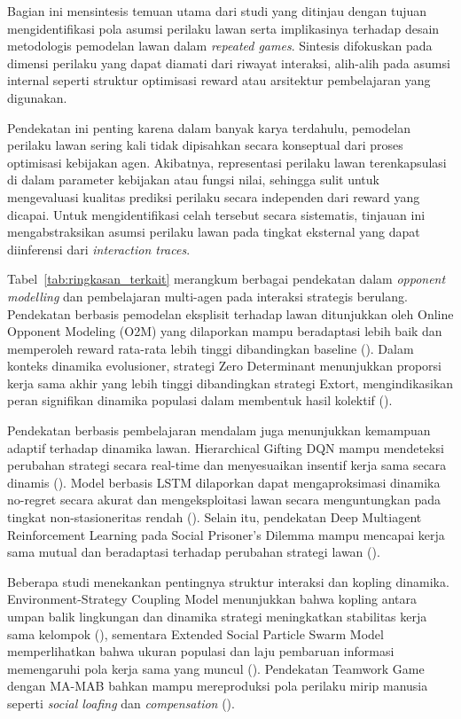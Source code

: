 Bagian ini mensintesis temuan utama dari studi yang ditinjau dengan tujuan 
mengidentifikasi pola asumsi perilaku lawan serta implikasinya terhadap 
desain metodologis pemodelan lawan dalam \textit{repeated games}. 
Sintesis difokuskan pada dimensi perilaku yang dapat diamati dari riwayat 
interaksi, alih-alih pada asumsi internal seperti struktur optimisasi reward 
atau arsitektur pembelajaran yang digunakan.

Pendekatan ini penting karena dalam banyak karya terdahulu, pemodelan 
perilaku lawan sering kali tidak dipisahkan secara konseptual dari proses 
optimisasi kebijakan agen. Akibatnya, representasi perilaku lawan terenkapsulasi 
di dalam parameter kebijakan atau fungsi nilai, sehingga sulit untuk 
mengevaluasi kualitas prediksi perilaku secara independen dari reward yang 
dicapai. Untuk mengidentifikasi celah tersebut secara sistematis, tinjauan ini 
mengabstraksikan asumsi perilaku lawan pada tingkat eksternal yang dapat 
diinferensi dari \textit{interaction traces}.

Tabel~\ref{tab:ringkasan_terkait} merangkum berbagai pendekatan dalam \textit{opponent modelling} dan pembelajaran multi-agen pada interaksi strategis berulang. Pendekatan berbasis pemodelan eksplisit terhadap lawan ditunjukkan oleh Online Opponent Modeling (O2M) yang dilaporkan mampu beradaptasi lebih baik dan memperoleh reward rata-rata lebih tinggi dibandingkan baseline (\cite{qiao_o2m_2024}). Dalam konteks dinamika evolusioner, strategi Zero Determinant menunjukkan proporsi kerja sama akhir yang lebih tinggi dibandingkan strategi Extort, mengindikasikan peran signifikan dinamika populasi dalam membentuk hasil kolektif (\cite{zhu_evolutionary_2025}).

Pendekatan berbasis pembelajaran mendalam juga menunjukkan kemampuan adaptif terhadap dinamika lawan. Hierarchical Gifting DQN mampu mendeteksi perubahan strategi secara real-time dan menyesuaikan insentif kerja sama secara dinamis (\cite{lv_inducing_2023}). Model berbasis LSTM dilaporkan dapat mengaproksimasi dinamika no-regret secara akurat dan mengeksploitasi lawan secara menguntungkan pada tingkat non-stasioneritas rendah (\cite{li_exploiting_2025}). Selain itu, pendekatan Deep Multiagent Reinforcement Learning pada Social Prisoner's Dilemma mampu mencapai kerja sama mutual dan beradaptasi terhadap perubahan strategi lawan (\cite{wang_achieving_2019}).

Beberapa studi menekankan pentingnya struktur interaksi dan kopling dinamika. Environment-Strategy Coupling Model menunjukkan bahwa kopling antara umpan balik lingkungan dan dinamika strategi meningkatkan stabilitas kerja sama kelompok (\cite{di_coupling_2023}), sementara Extended Social Particle Swarm Model memperlihatkan bahwa ukuran populasi dan laju pembaruan informasi memengaruhi pola kerja sama yang muncul (\cite{elhamer_effects_2020}). Pendekatan Teamwork Game dengan MA-MAB bahkan mampu mereproduksi pola perilaku mirip manusia seperti \textit{social loafing} dan \textit{compensation} (\cite{gomez_grounded_2025}).

